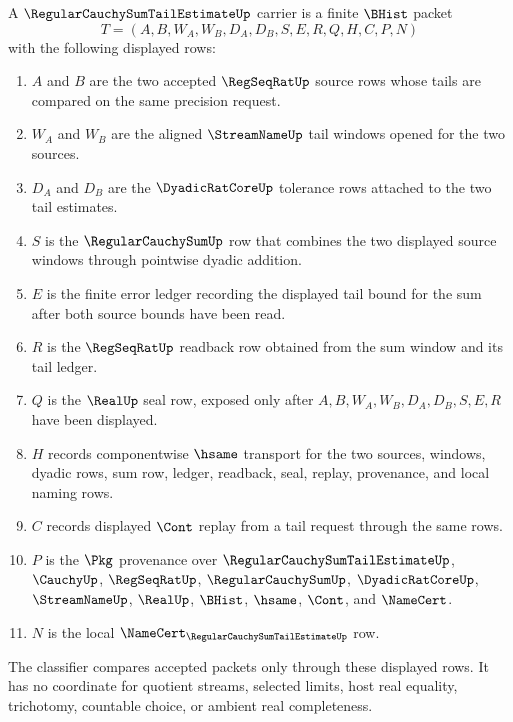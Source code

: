 \begin{definition}
\label{def:regular-cauchy-sum-tail-estimate-carrier}
A $\RegularCauchySumTailEstimateUp$ carrier is a finite $\BHist$ packet
$$
T=(A,B,W_A,W_B,D_A,D_B,S,E,R,Q,H,C,P,N)
$$
with the following displayed rows:
\begin{enumerate}
\item $A$ and $B$ are the two accepted $\RegSeqRatUp$ source rows whose tails are compared on the same precision request.
\item $W_A$ and $W_B$ are the aligned $\StreamNameUp$ tail windows opened for the two sources.
\item $D_A$ and $D_B$ are the $\DyadicRatCoreUp$ tolerance rows attached to the two tail estimates.
\item $S$ is the $\RegularCauchySumUp$ row that combines the two displayed source windows through pointwise dyadic addition.
\item $E$ is the finite error ledger recording the displayed tail bound for the sum after both source bounds have been read.
\item $R$ is the $\RegSeqRatUp$ readback row obtained from the sum window and its tail ledger.
\item $Q$ is the $\RealUp$ seal row, exposed only after $A,B,W_A,W_B,D_A,D_B,S,E,R$ have been displayed.
\item $H$ records componentwise $\hsame$ transport for the two sources, windows, dyadic rows, sum row, ledger, readback, seal, replay, provenance, and local naming rows.
\item $C$ records displayed $\Cont$ replay from a tail request through the same rows.
\item $P$ is the $\Pkg$ provenance over $\RegularCauchySumTailEstimateUp$, $\CauchyUp$, $\RegSeqRatUp$, $\RegularCauchySumUp$, $\DyadicRatCoreUp$, $\StreamNameUp$, $\RealUp$, $\BHist$, $\hsame$, $\Cont$, and $\NameCert$.
\item $N$ is the local $\NameCert_{\RegularCauchySumTailEstimateUp}$ row.
\end{enumerate}
The classifier compares accepted packets only through these displayed rows. It has no coordinate for quotient streams, selected limits, host real equality, trichotomy, countable choice, or ambient real completeness.
\end{definition}

